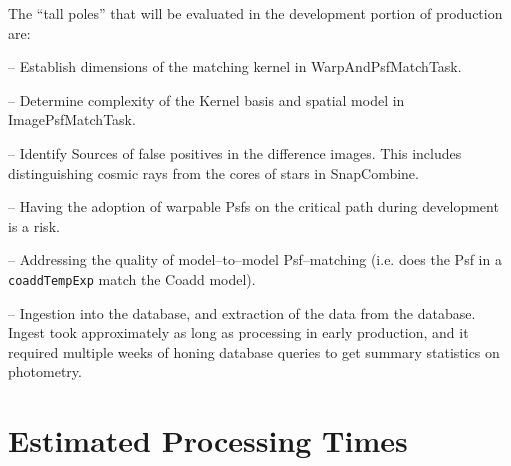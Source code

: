 \documentclass[prd, nofootinbib, floatfix, 11pt,tightenlines,times]{article}
\begin{document}
The ``tall poles'' that will be evaluated in the development portion of production are:

-- Establish dimensions of the matching kernel in WarpAndPsfMatchTask.

-- Determine complexity of the Kernel basis and spatial model in
ImagePsfMatchTask.

-- Identify Sources of false positives in the difference images.  This
includes distinguishing cosmic rays from the cores of stars in
SnapCombine.

-- Having the adoption of warpable Psfs on the critical path during
development is a risk.

-- Addressing the quality of model--to--model Psf--matching (i.e. does
the Psf in a {\tt coaddTempExp} match the Coadd model).
 
-- Ingestion into the database, and extraction of the data from the
database.  Ingest took approximately as long as processing in early
production, and it required multiple weeks of honing database queries
to get summary statistics on photometry.


\clearpage 
\section{Estimated Processing Times} 
\end{document}

